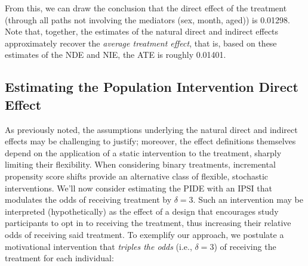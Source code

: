 \documentclass[12pt, krantz2,]{krantz}
\newenvironment{Shaded}{\begin{snugshade}}{\end{snugshade}}
\newcommand{\DataTypeTok}[1]{\textcolor[rgb]{0.27,0.27,0.27}{#1}}
\newcommand{\DecValTok}[1]{\textcolor[rgb]{0.06,0.06,0.06}{#1}}
\newcommand{\FloatTok}[1]{\textcolor[rgb]{0.06,0.06,0.06}{#1}}
\newcommand{\KeywordTok}[1]{\textcolor[rgb]{0.27,0.27,0.27}{\textbf{#1}}}
\newcommand{\NormalTok}[1]{#1}
\newcommand{\OperatorTok}[1]{\textcolor[rgb]{0.43,0.43,0.43}{\textbf{#1}}}
\newcommand{\OtherTok}[1]{\textcolor[rgb]{0.37,0.37,0.37}{#1}}
\newcommand{\StringTok}[1]{\textcolor[rgb]{0.5,0.5,0.5}{#1}}
\theoremstyle{definition}
\theoremstyle{definition}
\theoremstyle{definition}
\newcommand{\1}{\mathbbm{1}}
\begin{document}
\begin{Shaded}
\end{Shaded}

From this, we can draw the conclusion that the direct effect of the treatment
(through all paths not involving the mediators (sex, month, aged)) is
0.01298. Note that, together, the estimates of
the natural direct and indirect effects approximately recover the \emph{average
treatment effect}, that is, based on these estimates of the NDE and NIE, the
ATE is roughly
0.01401.

\hypertarget{estimating-the-population-intervention-direct-effect}{%
\subsection{Estimating the Population Intervention Direct Effect}\label{estimating-the-population-intervention-direct-effect}}

As previously noted, the assumptions underlying the natural direct and indirect
effects may be challenging to justify; moreover, the effect definitions
themselves depend on the application of a static intervention to the treatment,
sharply limiting their flexibility. When considering binary treatments,
incremental propensity score shifts provide an alternative class of flexible,
stochastic interventions. We'll now consider estimating the PIDE with an IPSI
that modulates the odds of receiving treatment by \(\delta = 3\). Such an
intervention may be interpreted (hypothetically) as the effect of a design that
encourages study participants to opt in to receiving the treatment, thus
increasing their relative odds of receiving said treatment. To exemplify our
approach, we postulate a motivational intervention that \emph{triples the odds}
(i.e., \(\delta = 3\)) of receiving the treatment for each individual:
\end{document}
